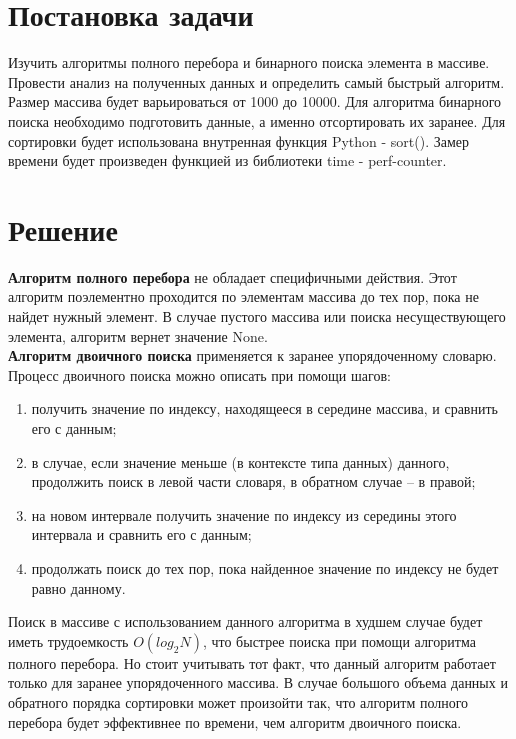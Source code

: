 \documentclass[a4paper, 12pt]{article}
\begin{document}
\tableofcontents
\clearpage
\newpage


\section{Постановка задачи}
\hspace*{5mm} Изучить алгоритмы полного перебора и бинарного поиска элемента в массиве. Провести анализ на полученных данных и определить самый быстрый алгоритм. Размер массива будет варьироваться от 1000 до 10000.
Для алгоритма бинарного поиска необходимо подготовить данные, а именно отсортировать их заранее. Для сортировки будет использована внутренная функция Python - sort(). Замер времени будет произведен функцией из библиотеки time - perf-counter. 
	

\section{Решение}
	\hspace*{5mm} \textbf{Алгоритм полного перебора} не обладает специфичными действия. Этот алгоритм поэлементно проходится по элементам массива до тех пор, пока не найдет нужный элемент. В случае пустого массива или поиска несуществующего элемента, алгоритм вернет значение None.
	\\\hspace*{5mm} \textbf{Алгоритм двоичного поиска} применяется к заранее упорядоченному словарю. Процесс двоичного поиска можно описать при помощи шагов:
	\begin{enumerate}
		\item получить значение по индексу, находящееся в середине массива, и сравнить его с данным;
		\item в случае, если значение меньше (в контексте типа данных) данного, продолжить поиск в левой части словаря, в обратном случае – в правой;
		\item на новом интервале получить значение по индексу из середины этого интервала и сравнить его с данным;
		\item продолжать поиск до тех пор, пока найденное значение по индексу не будет равно данному.
	\end{enumerate}
	\hspace*{5mm}Поиск в массиве с использованием данного алгоритма в худшем случае будет иметь трудоемкость $O(log_2N)$, что быстрее поиска при помощи алгоритма полного перебора. Но стоит учитывать тот факт, что данный
	алгоритм работает только для заранее упорядоченного массива. В случае большого объема данных и обратного порядка сортировки может произойти так, что алгоритм полного перебора будет эффективнее по времени, чем
	алгоритм двоичного поиска. 
	
\end{document}
